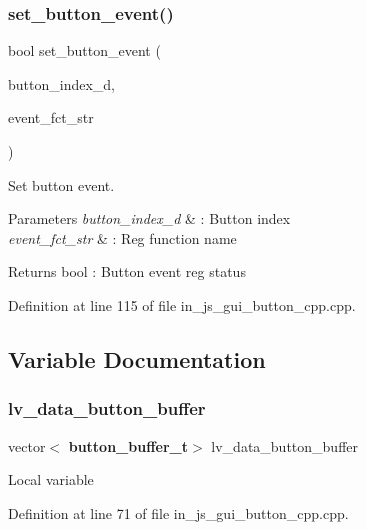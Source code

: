 \subsubsection{set\_button\_event()}
{\footnotesize\ttfamily bool set\+\_\+button\+\_\+event (\begin{DoxyParamCaption}\item[{double}]{button\+\_\+index\+\_\+d,  }\item[{wx\+String}]{event\+\_\+fct\+\_\+str }\end{DoxyParamCaption})}



Set button event. 


\begin{DoxyParams}{Parameters}
{\em button\+\_\+index\+\_\+d} & \+: Button index \\
\hline
{\em event\+\_\+fct\+\_\+str} & \+: Reg function name \\
\hline
\end{DoxyParams}
\begin{DoxyReturn}{Returns}
bool \+: Button event reg status 
\end{DoxyReturn}


Definition at line 115 of file in\+\_\+js\+\_\+gui\+\_\+button\+\_\+cpp.\+cpp.



\subsection{Variable Documentation}
\mbox{\label{group___button_ga72f70225064d049b43c0120b465cc1ec}} 
\subsubsection{lv\_data\_button\_buffer}
{\footnotesize\ttfamily vector$<$\textbf{ button\+\_\+buffer\+\_\+t}$>$ lv\+\_\+data\+\_\+button\+\_\+buffer}

Local variable 

Definition at line 71 of file in\+\_\+js\+\_\+gui\+\_\+button\+\_\+cpp.\+cpp.


